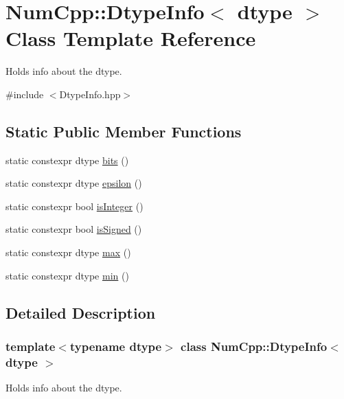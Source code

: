 \hypertarget{class_num_cpp_1_1_dtype_info}{}\section{Num\+Cpp\+:\+:Dtype\+Info$<$ dtype $>$ Class Template Reference}
\label{class_num_cpp_1_1_dtype_info}


Holds info about the dtype.  




{\ttfamily \#include $<$Dtype\+Info.\+hpp$>$}

\subsection*{Static Public Member Functions}
\begin{DoxyCompactItemize}
\item 
static constexpr dtype \mbox{\hyperlink{class_num_cpp_1_1_dtype_info_a938bb36dda6d59dccebe73aa25c0e849}{bits}} ()
\item 
static constexpr dtype \mbox{\hyperlink{class_num_cpp_1_1_dtype_info_a1afd447920d6512f6d3e7acdc08cfca6}{epsilon}} ()
\item 
static constexpr bool \mbox{\hyperlink{class_num_cpp_1_1_dtype_info_a32d737185a788bba65eba2d26fbc5bd8}{is\+Integer}} ()
\item 
static constexpr bool \mbox{\hyperlink{class_num_cpp_1_1_dtype_info_ac21f1389476091ea0b8d966e657fe647}{is\+Signed}} ()
\item 
static constexpr dtype \mbox{\hyperlink{class_num_cpp_1_1_dtype_info_ad24c59bdfce18ae8fb3aedef097231cf}{max}} ()
\item 
static constexpr dtype \mbox{\hyperlink{class_num_cpp_1_1_dtype_info_aef92445d06c7c31cd0b2622771457190}{min}} ()
\end{DoxyCompactItemize}


\subsection{Detailed Description}
\subsubsection*{template$<$typename dtype$>$\newline
class Num\+Cpp\+::\+Dtype\+Info$<$ dtype $>$}

Holds info about the dtype. 

